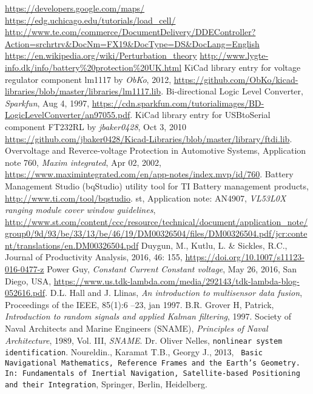 \begin{thebibliography}{99}
	\url{https://developers.google.com/maps/}
	\url{https://edg.uchicago.edu/tutorials/load_cell/}
	\url{http://www.te.com/commerce/DocumentDelivery/DDEController?Action=srchrtrv&DocNm=FX19&DocType=DS&DocLang=English}
	\url{https://en.wikipedia.org/wiki/Perturbation_theory}
	\url{http://www.lygte-info.dk/info/battery\%20protection\%20UK.html}
	KiCad library entry for voltage regulator component lm1117 by \emph{ObKo}, 2012,
	\url{https://github.com/ObKo/kicad-libraries/blob/master/libraries/lm1117.lib}.
	Bi-directional Logic Level Converter, \emph{Sparkfun}, Aug 4, 1997,
	\url{https://cdn.sparkfun.com/tutorialimages/BD-LogicLevelConverter/an97055.pdf}.
	KiCad library entry for USBtoSerial component FT232RL by \emph{jbaker0428}, Oct 3, 2010
	\url{https://github.com/jbaker0428/Kicad-Libraries/blob/master/library/ftdi.lib}.
	Overvoltage and Reverce-voltage Protection in Automotive Systems,
	Application note 760, \emph{Maxim integrated}, Apr 02, 2002, 
	\url{https://www.maximintegrated.com/en/app-notes/index.mvp/id/760}.
	Battery Management Studio (bqStudio) utility tool for TI Battery management products, \url{http://www.ti.com/tool/bqstudio}.
	\gls{st}, Application note: AN4907, \emph{VL53L0X ranging module cover window guidelines},
	\url{http://www.st.com/content/ccc/resource/technical/document/application_note/group0/9d/93/be/33/13/be/46/19/DM00326504/files/DM00326504.pdf/jcr:content/translations/en.DM00326504.pdf}
	Duygun, M., Kutlu, L. \& Sickles, R.C., Journal of Productivity Analysis, 2016, 46: 155, \url{https://doi.org/10.1007/s11123-016-0477-z}
	Power Guy, \emph{Constant Current Constant voltage}, May 26, 2016, San Diego, USA,
	\url{https://www.us.tdk-lambda.com/media/292143/tdk-lambda-blog-052616.pdf}.
	D.L. Hall and J. Llinas, \emph{An introduction to multisensor data fusion}, 
	Proceedings of the IEEE, 85(1):6 –23, jan 1997.
	B.R. Grover H, Patrick, \emph{Introduction to random signals and applied Kalman filtering}, 1997. 
	Society of Naval Architects and Marine Engineers (SNAME), \emph{Principles of Naval Architecture}, 1989, Vol. III, \emph{SNAME}. 
	Dr. Oliver Nelles, \texttt{nonlinear system identification}.
	Noureldin., Karamat T.B., Georgy J., 2013, \texttt{ Basic Navigational Mathematics, Reference Frames and the Earth’s Geometry. In: Fundamentals of Inertial Navigation, Satellite-based 	Positioning and their Integration}, Springer, Berlin, Heidelberg.

\end{thebibliography}
